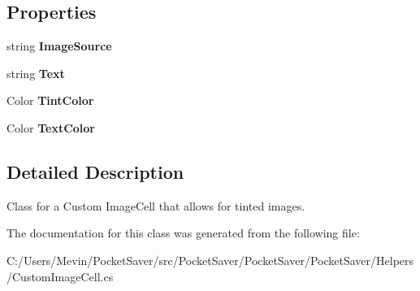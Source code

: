 \subsection*{Properties}
\begin{DoxyCompactItemize}
\item 
\mbox{\label{class_pocket_saver_1_1_helpers_1_1_custom_image_cell_a2a0cc37177f6a8d568cd12e0a8e0e46c}} 
string {\bfseries Image\+Source}
\item 
\mbox{\label{class_pocket_saver_1_1_helpers_1_1_custom_image_cell_a392bbbe5b2c146ff0b52b7476e0aabc7}} 
string {\bfseries Text}
\item 
\mbox{\label{class_pocket_saver_1_1_helpers_1_1_custom_image_cell_a7e60b02d00da82b47de972b574d7dd17}} 
Color {\bfseries Tint\+Color}
\item 
\mbox{\label{class_pocket_saver_1_1_helpers_1_1_custom_image_cell_a2e64dc3584ba512b306b58c487aaba17}} 
Color {\bfseries Text\+Color}
\end{DoxyCompactItemize}


\subsection{Detailed Description}
Class for a Custom Image\+Cell that allows for tinted images. 



The documentation for this class was generated from the following file\+:\begin{DoxyCompactItemize}
\item 
C\+:/\+Users/\+Mevin/\+Pocket\+Saver/src/\+Pocket\+Saver/\+Pocket\+Saver/\+Pocket\+Saver/\+Helpers/Custom\+Image\+Cell.\+cs\end{DoxyCompactItemize}
